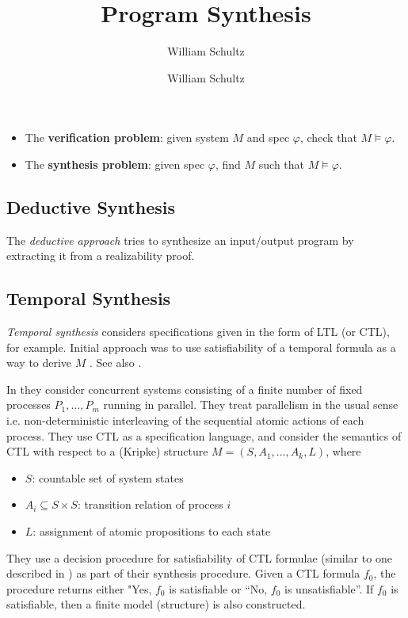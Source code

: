 \documentclass[10pt,a4paper]{article}
\author{William Schultz}
\begin{document}
\title{Program Synthesis}
\author{William Schultz}
\maketitle


\begin{itemize}
    \item The \textbf{verification problem}: given system $M$ and spec $\varphi$, check that $M \vDash \varphi$.
    \item The \textbf{synthesis problem}: given spec $\varphi$, find $M$ such that $M \vDash \varphi$.
\end{itemize}

\subsection*{Deductive Synthesis}

The \textit{deductive approach} \cite{manna1980deductive} tries to synthesize an input/output program by extracting it from a realizability proof.

\subsection*{Temporal Synthesis}

\textit{Temporal synthesis} considers specifications given in the form of LTL (or CTL), for example. Initial approach was to use satisfiability of a temporal formula as a way to derive $M$ \cite{1981clarkemerson}. 
See also \cite{1984mannawolper}. 

In \cite{1981clarkemerson} they consider concurrent systems consisting of a finite number of fixed processes $P_1,\dots,P_m$ running in parallel. They treat parallelism in the usual sense i.e. non-deterministic interleaving of the sequential atomic actions of each process. They use CTL as a specification language, and consider the semantics of CTL with respect to a (Kripke) structure $M=(S,A_1,\dots,A_k,L)$, where
\begin{itemize}
    \item $S$: countable set of system states
    \item $A_i \subseteq S \times S$: transition relation of process $i$
    \item $L$: assignment of atomic propositions to each state
\end{itemize}
They use a decision procedure for satisfiability of CTL formulae (similar to one described in \cite{1981benari}) as part of their synthesis procedure. Given a CTL formula $f_0$, the procedure returns either "Yes, $f_0$ is satisfiable or ``No, $f_0$ is unsatisfiable''. If $f_0$ is satisfiable, then a finite model (structure) is also constructed. 
\end{document}

